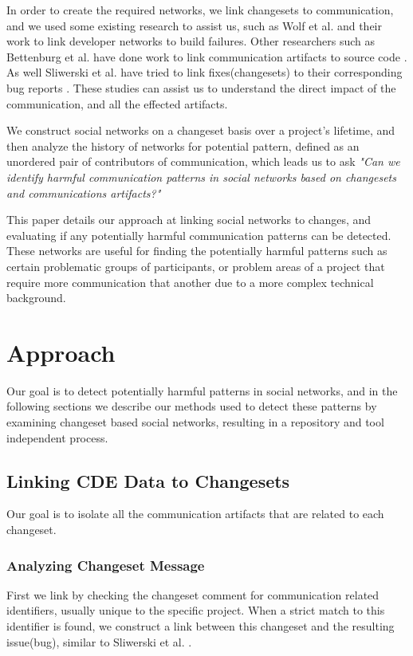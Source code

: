 \documentclass[conference]{IEEEtran}
\begin{document}
In order to create the required networks, we link changesets to communication, and we used some existing research to assist us, such as Wolf et al. and their work to link developer networks to build failures\cite{4721184}.  Other researchers such as Bettenburg et al. have done work to link communication artifacts to source code \cite{Bettenburg:2008:ESI:1370750.1370757}.  As well Sliwerski et al. have tried to link fixes(changesets) to their corresponding bug reports \cite{Sliwerski:2005:CIF:1083142.1083147}.  These studies can assist us to understand the direct impact of the communication, and all the effected artifacts.  

We construct social networks on a changeset basis over a project's lifetime, and then analyze the history of networks for potential pattern, defined as an unordered pair of contributors of communication, which leads us to ask \textit{"Can we identify harmful communication patterns in social networks based on changesets and communications artifacts?"} 

This paper details our approach at linking social networks to changes, and evaluating if any potentially harmful communication patterns can be detected.  These networks are useful for finding the potentially harmful patterns such as certain problematic groups of participants, or problem areas of a project that require more communication that another due to a more complex technical background. 

\section{Approach}
Our goal is to detect potentially harmful patterns in social networks, and in the following sections we describe our methods used to detect these patterns by examining changeset based social networks, resulting in a repository and tool independent process.  

\subsection{Linking CDE Data to Changesets}
Our goal is to isolate all the communication artifacts that are related to each changeset.  
\subsubsection{Analyzing Changeset Message}
First we link by checking the changeset comment for communication related identifiers, usually unique to the specific project.  When a strict match to this identifier is found, we construct a link between this changeset and the resulting issue(bug), similar to Sliwerski et al. \cite{Sliwerski:2005:CIF:1083142.1083147}.
\end{document}
